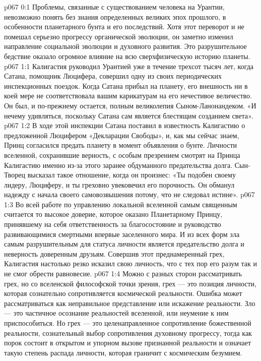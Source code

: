 \author{Мелхиседек}
\vs p067 0:1 Проблемы, связанные с существованием человека на Урантии, невозможно понять без знания определенных великих эпох прошлого, в особенности планетарного бунта и его последствий. Хотя этот переворот и не помешал серьезно прогрессу органической эволюции, он заметно изменил направление социальной эволюции и духовного развития. Это разрушительное бедствие оказало огромное влияние на всю сверхфизическую историю планеты.
\vs p067 1:1 Калигастия руководил Урантией уже в течение трехсот тысяч лет, когда Сатана, помощник Люцифера, совершил одну из своих периодических инспекционных поездок. Когда Сатана прибыл на планету, его внешность ни в коей мере не соответствовала вашим карикатурам на его нечестивое величество. Он был, и по\hyp{}прежнему остается, полным великолепия Сыном\hyp{}Ланонандеком. «И нечему удивляться, поскольку Сатана сам является блестящим созданием света».
\vs p067 1:2 В ходе этой инспекции Сатана поставил в известность Калигастию о предложенной Люцифером «Декларации Свободы», и, как мы сейчас знаем, Принц согласился предать планету в момент объявления о бунте. Личности вселенной, сохранившие верность, с особым презрением смотрят на Принца Калигастию именно из\hyp{}за этого заранее обдуманного предательства долга. Сын\hyp{}Творец высказал такое отношение, когда он произнес: «Ты подобен своему лидеру, Люциферу, и ты греховно увековечил его порочность. Он обманул надежду с начала своего самовозвышения потому, что не следовал истине».
\vs p067 1:3 Во всей работе по управлению локальной вселенной самым священным считается то высокое доверие, которое оказано Планетарному Принцу, принявшему на себя ответственность за благосостояние и руководство развивающимися смертными впервые заселенного мира. И из всех форм зла самым разрушительным для статуса личности является предательство долга и неверность доверенным друзьям. Совершив этот преднамеренный грех, Калигастия настолько резко исказил свою личность, что с тех пор его разум так и не смог обрести равновесие.
\vs p067 1:4 \pc Можно с разных сторон рассматривать грех, но со вселенской философской точки зрения, грех --- это позиция личности, которая сознательно сопротивляется космической реальности. Ошибка может рассматриваться как неправильное представление или искажение реальности. Зло --- это частичное осознание реальностей вселенной, или неумение к ним приспособиться. Но грех --- это целенаправленное сопротивление божественной реальности, сознательный выбор сопротивления духовному прогрессу, тогда как порок состоит в открытом и упорном вызове признанной реальности и означает такую степень распада личности, которая граничит с космическим безумием.
